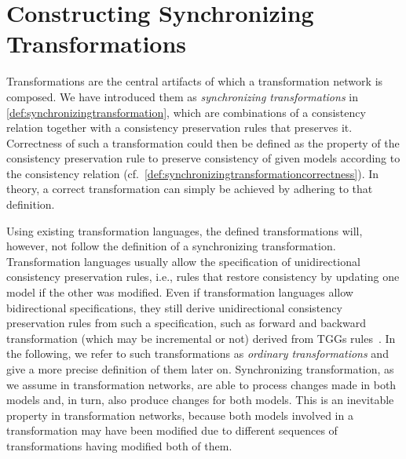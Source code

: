 \chapter{Constructing Synchronizing Transformations
}
\label{chap:synchronization}



Transformations are the central artifacts of which a transformation network is composed.
We have introduced them as \emph{synchronizing transformations} in \autoref{def:synchronizingtransformation}, which are combinations of a consistency relation together with a consistency preservation rules that preserves it.
Correctness of such a transformation could then be defined as the property of the consistency preservation rule to preserve consistency of given models according to the consistency relation (cf.\ \autoref{def:synchronizingtransformationcorrectness}).
In theory, a correct transformation can simply be achieved by adhering to that definition.

Using existing transformation languages, the defined transformations will, however, not follow the definition of a synchronizing transformation.
Transformation languages usually allow the specification of unidirectional consistency preservation rules, i.e., rules that restore consistency by updating one model if the other was modified.
Even if transformation languages allow bidirectional specifications, they still derive unidirectional consistency preservation rules from such a specification, such as forward and backward transformation (which may be incremental or not) derived from \glspl{TGG} rules~\cite{leblebici2014IncrementalTGGSurvey-GTVMT}.
In the following, we refer to such transformations as \emph{ordinary transformations} and give a more precise definition of them later on.
Synchronizing transformation, as we assume in transformation networks, are able to process changes made in both models and, in turn, also produce changes for both models.
This is an inevitable property in transformation networks, because both models involved in a transformation may have been modified due to different sequences of transformations having modified both of them.

